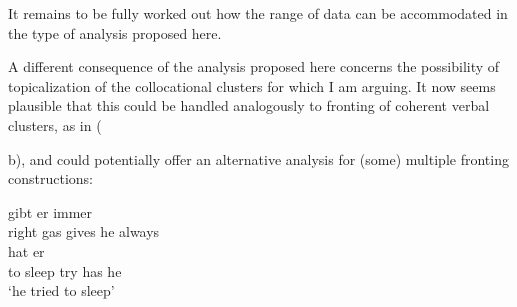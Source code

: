 \documentclass[11pt,a4paper,fleqn]{article}
\newcounter{lsptempcnt}
\newcommand{\mex}[1]{\setcounter{lsptempcnt}{\value{equation}}%
\addtocounter{lsptempcnt}{#1}%
\arabic{lsptempcnt}}%
\begin{document}
\begin{table}[H]
\end{table}
It remains to be fully worked out how the range of data can be accommodated in the type of analysis proposed here.

A different consequence of the analysis proposed here concerns the possibility of topicalization of the collocational clusters for which I am arguing. 
It now seems plausible that this could be handled analogously to fronting of coherent verbal clusters, as in (\mex{1}b), and could potentially offer an alternative analysis for (some) multiple fronting constructions:
 
\begin{exe} 
  \ex \begin{xlist}
     \ex{} gibt er immer  \\                     		
	   right gas gives he always \\
     \ex{} hat er  \\                     		
               {to sleep} try has he \\
      \glt `he tried to sleep'
\end{xlist}
\end{exe}
\end{document}
